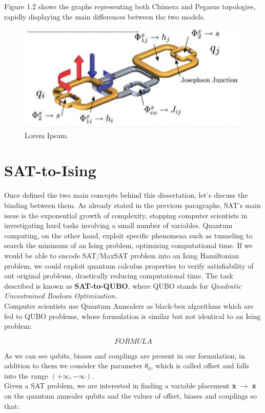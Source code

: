 Figure 1.2 shows the graphs representing both Chimera and Pegasus topologies, rapidly displaying the main differences between the two models. 

\begin{figure}[t]
	\begin{center}
	\includegraphics{QA.PNG}
	\caption{Lorem Ipsum.}
	\end{center}
\end{figure}

\section{SAT-to-Ising}
\label{sec:SATtoQUBO}

Once defined the two main concepts behind this dissertation, let's discuss the binding between them. As already stated in the previous paragraphs, SAT's main issue is the exponential growth of complexity, stopping computer scientists in investigating hard tasks involving a small number of variables. Quantum computing, on the other hand, exploit specific phenomena such as tunneling to search the minimum of an Ising problem, optimizing computational time. If we would be able to encode SAT/MaxSAT problem into an Ising Hamiltonian problem, we could exploit quantum calculus properties to verify satisfiability of out original problems, drastically reducing computational time. The task described is known as \textbf{SAT-to-QUBO}, where QUBO stands for \textit{Quadratic Uncostrained Boolean Optimization}. \\
Computer scientists use Quantum Annealers as black-box algorithms which are fed to QUBO problems, whose formulation is similar but not identical to an Ising problem:

\begin{equation}
    FORMULA
\end{equation}

As we can see qubits, biases and couplings are present in our formulation; in addition to them we consider the parameter $\theta_0$, which is called offset and falls into the range $(+\infty, -\infty)$. \\
Given a SAT problem, we are interested in finding a variable placement \textbf{x} $\rightarrow$ \textbf{z} on the quantum annealer qubits and the values of offset, biases and couplings so that:

